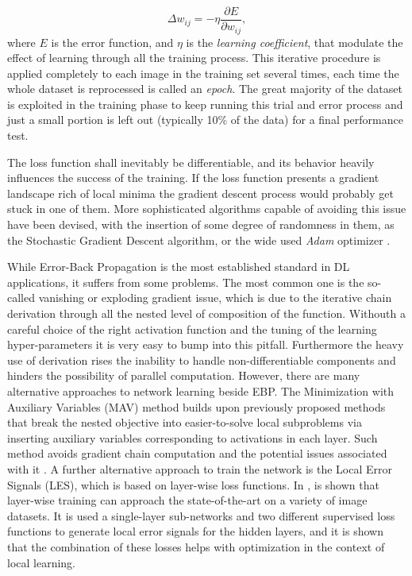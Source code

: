 \documentclass[12pt,a4paper]{report}
\begin{document}
\begin{equation}
    \Delta w_{ij} = - \eta \frac{\partial E}{\partial w_{ij}},
    \label{eq:weight_update}
\end{equation}
where $E$ is the error function, and $\eta$ is the \textit{learning coefficient}, that modulate the effect of learning through all the training process. This iterative procedure is applied completely to each image in the training set several times, each time the whole dataset is reprocessed is called an \textit{epoch}. The great majority of the dataset is exploited in the training phase to keep running this trial and error process and just a small portion is left out (typically 10\% of the data) for a final performance test.

The loss function shall inevitably be differentiable, and its behavior heavily influences the success of the training. If the loss function presents a gradient landscape rich of local minima the gradient descent process would probably get stuck in one of them. More sophisticated algorithms capable of avoiding this issue have been devised, with the insertion of some degree of randomness in them, as the Stochastic Gradient Descent algorithm, or the wide used \textit{Adam} optimizer \cite{1412.6980}.

While Error-Back Propagation is the most established standard in DL applications, it suffers from some problems. The most common one is the so-called vanishing or exploding gradient issue, which is due to the iterative chain derivation through all the nested level of composition of the function. Withouth a careful choice of the right activation function and the tuning of the learning hyper-parameters it is very easy to bump into this pitfall. Furthermore the heavy use of derivation rises the inability to handle non-differentiable components and hinders the possibility of parallel computation. However, there are many alternative approaches to network learning beside EBP. The Minimization with Auxiliary Variables (MAV) method builds upon previously proposed methods that break the nested objective into easier-to-solve local subproblems via inserting auxiliary variables corresponding to activations in each layer. Such method avoids gradient chain computation and the potential issues associated with it \cite{1806.09077}. A further alternative approach to train the network is the Local Error Signals (LES), which is based on layer-wise loss functions. In \cite{1901.06656}, is shown that layer-wise training can approach the state-of-the-art on a variety of image datasets. It is used a single-layer sub-networks and two different supervised loss functions to generate local error signals for the hidden layers, and it is shown that the combination of these losses helps with optimization in the context of local learning.
\end{document}
